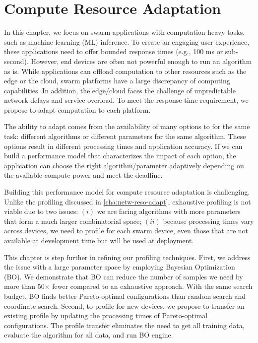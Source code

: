 \documentclass[thesis.tex]{subfiles}
\begin{document}
\chapter{Compute Resource Adaptation}
\label{cha:comp-reso-adapt}

In this chapter, we focus on swarm applications with computation-heavy tasks,
such as machine learning (ML) inference. To create an engaging user experience,
these applications need to offer bounded response times (e.g., 100 ms or
sub-second). However, end devices are often not powerful enough to run an
algorithm as is. While applications can offload computation to other resources
such as the edge or the cloud, swarm platforms have a large discrepancy of
computing capabilities. In addition, the edge/cloud faces the challenge of
unpredictable network delays and service overload. To meet the response time
requirement, we propose to adapt computation to each platform.

The ability to adapt comes from the availability of many options to for the same
task: different algorithms or different parameters for the same algorithm. These
options result in different processing times and application accuracy. If we can
build a performance model that characterizes the impact of each option, the
application can choose the right algorithm/parameter adaptively depending on the
available compute power and meet the deadline.

Building this performance model for compute resource adaptation is
challenging. Unlike the profiling discussed in \autoref{cha:netw-reso-adapt},
exhaustive profiling is not viable due to two issues: $(i)$ we are facing
algorithms with more parameters that form a much larger combinatorial space;
$(ii)$ because processing times vary across devices, we need to profile for each
swarm device, even those that are not available at development time but will be
used at deployment.

This chapter is step further in refining our profiling techniques. First, we
address the issue with a large parameter space by employing Bayesian
Optimization (BO). We demonstrate that BO can reduce the number of samples we
need by more than 50$\times$ fewer compared to an exhaustive approach. With the
same search budget, BO finds better Pareto-optimal configurations than random
search and coordinate search. Second, to profile for new devices, we propose to
transfer an existing profile by updating the processing times of Pareto-optimal
configurations. The profile transfer eliminates the need to get all training
data, evaluate the algorithm for all data, and run BO engine.






\end{document}
